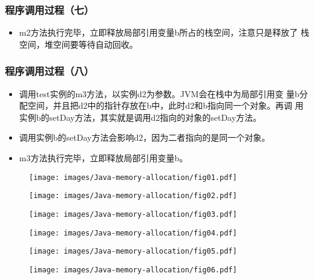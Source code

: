 \subsubsection{程序调用过程（七）}

\begin{itemize}
\item m2方法执行完毕，立即释放局部引用变量b所占的栈空间，注意只是释放了
  栈空间，堆空间要等待自动回收。
\end{itemize}

\subsubsection{程序调用过程（八）}

\begin{itemize}
\item 调用test实例的m3方法，以实例d2为参数。JVM会在栈中为局部引用变
  量b分配空间，并且把d2中的指针存放在b中，此时d2和b指向同一个对象。再调
  用实例b的setDay方法，其实就是调用d2指向的对象的setDay方法。
\item 调用实例b的setDay方法会影响d2，因为二者指向的是同一个对象。
\item m3方法执行完毕，立即释放局部引用变量b。
\end{itemize}

\begin{figure}[htb]
  \begin{minipage}[t]{0.5\linewidth}
    \centering
    \texttt{[image: images/Java-memory-allocation/fig01.pdf]}
  \end{minipage}%
  \begin{minipage}[t]{0.5\linewidth}
    \centering
    \texttt{[image: images/Java-memory-allocation/fig02.pdf]}
  \end{minipage}
\end{figure}

\begin{figure}[htb]
  \begin{minipage}[t]{0.5\linewidth}
    \centering
    \texttt{[image: images/Java-memory-allocation/fig03.pdf]}
  \end{minipage}%
  \begin{minipage}[t]{0.5\linewidth}
    \centering
    \texttt{[image: images/Java-memory-allocation/fig04.pdf]}
  \end{minipage}
\end{figure}

\begin{figure}[htb]
  \begin{minipage}[t]{0.5\linewidth}
    \centering
    \texttt{[image: images/Java-memory-allocation/fig05.pdf]}
  \end{minipage}%
  \begin{minipage}[t]{0.5\linewidth}
    \centering
    \texttt{[image: images/Java-memory-allocation/fig06.pdf]}
  \end{minipage}
\end{figure}

